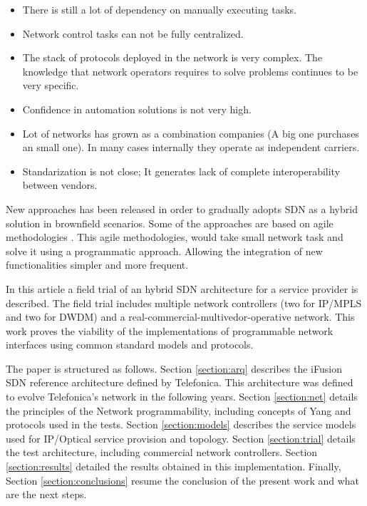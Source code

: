 \documentclass[a4paper,fleqn]{cas-dc}
\begin{document}
\begin{itemize}
    \item There is still a lot of dependency on manually executing tasks.
    \item Network control tasks can not be fully centralized.
    \item The stack of protocols deployed in the network is very complex.  The knowledge that network operators requires to solve problems continues to be very specific.
    \item Confidence in automation solutions is not very high.
    \item Lot of networks has grown as a combination companies (A big one purchases an small one). In many cases internally they operate as independent carriers. \item Standarization is not close; It generates lack of complete interoperability between vendors.
\end{itemize}

New approaches has been released in order to gradually adopts SDN as a hybrid solution in brownfield scenarios. Some of the approaches are based on agile methodologies \cite{devlic2012use,choi2018agile}. 
This agile methodologies, would take small network task and solve it using a programmatic approach. Allowing the integration of new functionalities simpler and more frequent.

In this article a field trial of an hybrid SDN architecture for a service provider is described. The field trial includes multiple network controllers (two for IP/MPLS and two for DWDM) and a real-commercial-multivedor-operative network. This work proves the viability of the implementations of programmable network interfaces using common standard models and protocols.

The paper is structured as follows. Section \cref{section:arq} describes the iFusion SDN reference architecture defined by Telefonica. This architecture was defined to evolve Telefonica's network in the following years. Section \cref{section:net} details the principles of the Network programmability, including concepts of Yang and protocols used in the tests. Section \cref{section:models} describes the service models used for IP/Optical service provision and topology. Section \cref{section:trial} details the test architecture, including commercial network controllers. Section \cref{section:results} detailed the results obtained in this implementation. Finally, Section \cref{section:conclusions} resume the conclusion of the present work and what are the next steps.    
\end{document}
